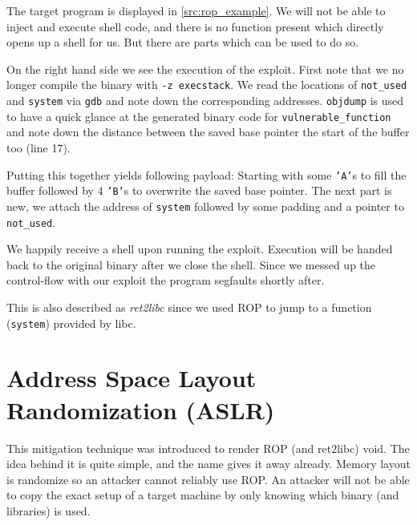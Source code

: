 \documentclass[article]{uibk}
\begin{document}
The target program is displayed in \cref{src:rop_example}. We will not be able
to inject and execute shell code, and there is no function present which
directly opens up a shell for us. But there are parts which can be used to do
so.

On the right hand side we see the execution of the exploit. First note that we
no longer compile the binary with \texttt{-z execstack}. We read the locations
of \texttt{not\_used} and \texttt{system} via \texttt{gdb} and note down the
corresponding addresses. \texttt{objdump} is used to have a quick glance at the
generated binary code for \texttt{vulnerable\_function} and note down the
distance between the saved base pointer the start of the buffer too (line 17).

Putting this together yields following payload: Starting with some
\texttt{'A'}s to fill the buffer followed by 4 \texttt{'B'}s to overwrite the
saved base pointer. The next part is new, we attach the address of
\texttt{system} followed by some padding and a pointer to \texttt{not\_used}.

We happily receive a shell upon running the exploit. Execution will be handed
back to the original binary after we close the shell. Since we messed up the
control-flow with our exploit the program segfaults shortly after.

This is also described as \textit{ret2libc} since we used ROP to jump to a
function (\texttt{system}) provided by libc.

\section{Address Space Layout Randomization (ASLR)}

This mitigation technique was introduced to render ROP (and ret2libc) void. The
idea behind it is quite simple, and the name gives it away already. Memory
layout is randomize so an attacker cannot reliably use ROP. An attacker will
not be able to copy the exact setup of a target machine by only knowing which
binary (and libraries) is used.
\end{document}
